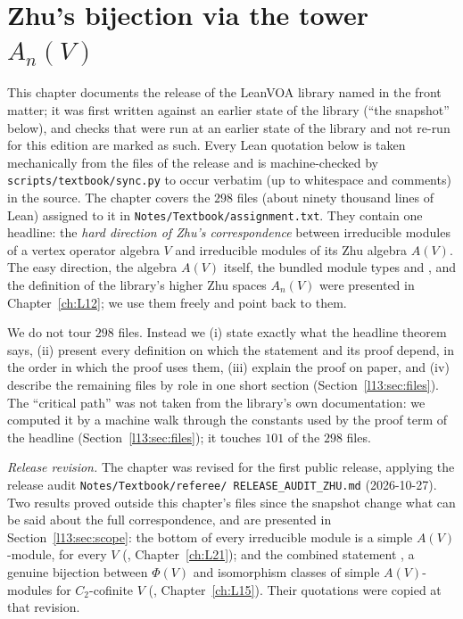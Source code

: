 \chapter{Zhu's bijection via the tower \texorpdfstring{$A_n(V)$}{A\_n(V)}}\label{ch:L13}
\begingroup\setlength{\emergencystretch}{3em}

\providecommand{\lthirteenvac}{\mathbf{1}}
\providecommand{\lthirteenVh}{\widehat{V}}
\providecommand{\lthirteenUE}{\mathcal{U}}
\providecommand{\lthirteenMbar}{\overline{M}}
\providecommand{\lthirteenIrr}{\mathrm{Irr}}
\providecommand{\lthirteenO}{O}

This chapter documents the release of the LeanVOA library named in the front matter; it was first written against an earlier state of the library (``the snapshot'' below), and checks that were
run at an earlier state of the library and not re-run for this edition are marked as such. Every Lean quotation below is taken mechanically from the files of the release and is machine-checked by
\texttt{scripts/textbook/sync.py} to occur verbatim (up to whitespace and comments) in the source. The chapter covers
the $298$ files  (about ninety thousand lines of Lean)
assigned to it in \texttt{Notes/Textbook/assignment.txt}. They contain one headline: the \emph{hard direction of
Zhu's correspondence} between irreducible modules of a vertex operator algebra $V$ and irreducible modules of its
Zhu algebra $A(V)$. The easy direction, the algebra $A(V)$ itself, the bundled module types  and
, and the definition of the library's higher Zhu spaces $A_n(V)$ were presented in
Chapter~\ref{ch:L12}; we use them freely and point back to them.

We do not tour $298$ files. Instead we (i) state exactly what the headline theorem says, (ii) present every
definition on which the statement and its proof depend, in the order in which the proof uses them, (iii) explain the
proof on paper, and (iv) describe the remaining files by role in one short section
(Section~\ref{l13:sec:files}). The ``critical path'' was not taken from the library's own documentation: we computed it
by a machine walk through the constants used by the proof term of the headline (Section~\ref{l13:sec:files}); it
touches $101$ of the $298$ files.

\emph{Release revision.} The chapter was revised for the first public release, applying the release audit \texttt{Notes/\allowbreak Textbook/\allowbreak referee/\allowbreak
RELEASE\_AUDIT\_ZHU.md} (2026-10-27). Two results proved outside this chapter's files since the snapshot change what can be
said about the full correspondence, and are presented in Section~\ref{l13:sec:scope}: the bottom of every irreducible module
is a simple $A(V)$-module, for every $V$ (, Chapter~\ref{ch:L21}); and
the combined statement , a genuine bijection between $\Phi(V)$ and isomorphism classes of
simple $A(V)$-modules for $C_2$-cofinite $V$ (,
Chapter~\ref{ch:L15}). Their quotations were copied at that revision.

